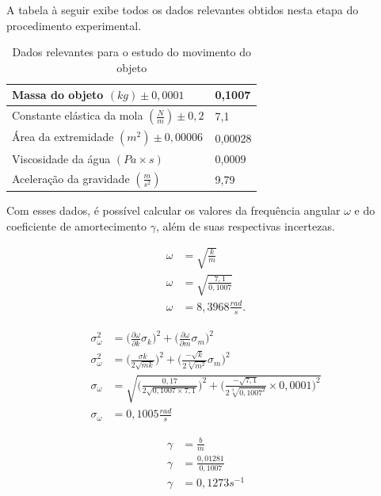 \documentclass[12pt]{article}
\begin{document}
		\newpage	
		A tabela à seguir exibe todos os dados relevantes obtidos nesta etapa do procedimento experimental.
		\begin{table}[H]
			\centering
			\begin{tabular}{|l|l|}
				\hline
				Massa do objeto $(kg) \pm 0,0001$ & 0,1007 \\ \hline
				Constante elástica da mola $(\frac{N}{m}) \pm 0,2$ & 7,1 \\ \hline
				Área da extremidade $(m^2) \pm 0,00006$ & 0,00028 \\ \hline
				Viscosidade da água $(Pa\times s)$ & 0,0009 \\ \hline
				Aceleração da gravidade $(\frac{m}{s^2})$ & 9,79 \\ \hline
			\end{tabular}
			\caption{Dados relevantes para o estudo do movimento do objeto
			}
			\label{tab:table2}
		\end{table}
	
		Com esses dados, é possível calcular os valores da frequência angular $\omega$ e do coeficiente de amortecimento $\gamma$, além de suas respectivas incertezas.
		
		\begin{align}
			\omega&=\sqrt{\frac{k}{m}} \nonumber \\
			\omega&=\sqrt{\frac{7,1}{0,1007}} \nonumber \\
			\omega&=8,3968 \frac{rad}{s}. \nonumber
		\end{align}
			
		\begin{align}
			\sigma_{\omega}^2 &= \biggr(\frac{\partial\omega}{\partial k}\sigma_k\biggl)^2 + \biggr(\frac{\partial\omega}{\partial m}\sigma_m\biggl)^2 \nonumber \\
			\sigma_{\omega}^2 &= \biggr(\frac{\sigma k}{2\sqrt{mk}}\biggl)^2 + \biggr(\frac{-\sqrt{k}}{2\sqrt[3]{m^2}}\sigma_m\biggl)^2 \nonumber \\
			\sigma_{\omega} &= \sqrt{\biggr(\frac{0,17}{2\sqrt{0,1007\times7,1}}\biggl)^2 + \biggr(\frac{-\sqrt{7,1}}{2\sqrt[3]{0,1007^2}}\times 0,0001\biggl)^2} \nonumber \\
			\sigma_{\omega} &= 0,1005 \frac{rad}{s} \nonumber
		\end{align}
		
		\begin{align}
			\gamma &= \frac{b}{m} \nonumber \\
			\gamma &= \frac{0,01281}{0,1007} \nonumber \\
			\gamma &= 0,1273 s^{-1} \nonumber
		\end{align}
		
\end{document}
